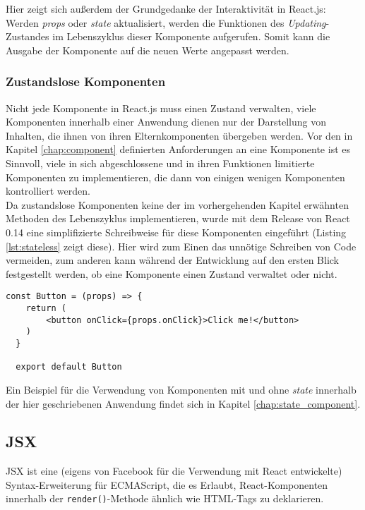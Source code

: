 Hier zeigt sich außerdem der Grundgedanke der Interaktivität in React.js: Werden \textit{props} oder \textit{state} aktualisiert, werden die Funktionen des \textit{Updating}-Zustandes im Lebenszyklus dieser Komponente aufgerufen. Somit kann die Ausgabe der Komponente auf die neuen Werte angepasst werden.

\subsubsection{Zustandslose Komponenten}
\label{chap:stateless}
Nicht jede Komponente in React.js muss einen Zustand verwalten, viele Komponenten innerhalb einer Anwendung dienen nur der Darstellung von Inhalten, die ihnen von ihren Elternkomponenten übergeben werden. Vor den in Kapitel \ref{chap:component} definierten Anforderungen an eine Komponente ist es Sinnvoll, viele in sich abgeschlossene und in ihren Funktionen limitierte Komponenten zu implementieren, die dann von einigen wenigen Komponenten kontrolliert werden.\\
Da zustandslose Komponenten keine der im vorhergehenden Kapitel erwähnten Methoden des Lebenszyklus implementieren, wurde mit dem Release von React 0.14\footnotemark{} eine simplifizierte Schreibweise für diese Komponenten eingeführt (Listing \ref{lst:stateless} zeigt diese). Hier wird zum Einen das unnötige Schreiben von Code vermeiden, zum anderen kann während der Entwicklung auf den ersten Blick festgestellt werden, ob eine Komponente einen Zustand verwaltet oder nicht.


\begin{lstlisting}[caption={Simplifizierte Schreibweise für Komponenten ohne \textit{state}}, label=lst:stateless]
  const Button = (props) => {
  	return (
  		<button onClick={props.onClick}>Click me!</button>
  	)
  }

  export default Button
\end{lstlisting}

Ein Beispiel für die Verwendung von Komponenten mit und ohne \textit{state} innerhalb der hier geschriebenen Anwendung findet sich in Kapitel \ref{chap:state_component}.

\subsection{JSX}
JSX ist eine (eigens von Facebook für die Verwendung mit React entwickelte) Syntax-Erweiterung für ECMAScript, die es Erlaubt, React-Komponenten innerhalb der \verb|render()|-Methode ähnlich wie HTML-Tags zu deklarieren.

